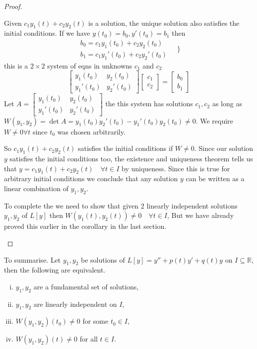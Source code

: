 \documentclass{article}
\theoremstyle{plain}
\theoremstyle{definition}
\numberwithin{equation}{section}
\begin{document}
\begin{proof}
\begin{enumerate}[(i)]
    Given $c_1y_1(t) + c_2y_2(t)$ is a solution, the unique solution also satisfies the initial conditions. If we have $y(t_0)=b_0, y'(t_0)=b_1$ then
    \[
    \begin{matrix}
        b_0 = c_1y_1(t_0) + c_2y_2(t_0) \\
        b_1 = c_1y_1'(t_0) + c_2y_2'(t_0)
    \end{matrix}\quad\Bigg\}
    \]
    this is a $2\times2$ system of eqns in unknowns $c_1$ and $c_2$
    \[
    \begin{bmatrix}
        y_1(t_0) & y_2(t_0) \\
        y_1'(t_0) & y_2'(t_0)
    \end{bmatrix}
    \begin{bmatrix}
        c_1 \\
        c_2
    \end{bmatrix}
    =
    \begin{bmatrix}
        b_0 \\
        b_1
    \end{bmatrix}
    \]
    Let $A = \begin{bmatrix}
        y_1(t_0) & y_2(t_0) \\
        y_1'(t_0) & y_2'(t_0)
    \end{bmatrix}$ the this system has solutions $c_1,c_2$ as long as $W(y_1,y_2) = \det A = y_1(t_0)y_2'(t_0) - y_1'(t_0)y_2(t_0) \neq 0$. We require $W\neq 0 \forall t$ since $t_0$ was chosen arbitrarily.

    So $c_1y_1(t) + c_2y_2(t)$ satisfies the initial conditions if $W\neq 0$. Since our solution $y$ satisfies the initial conditions too, the existence and uniqueness theorem tells us that $y=c_1y_1(t) + c_2y_2(t) \quad \forall t\in I$ by uniqueness. Since this is true for arbitrary initial conditions we conclude that any solution $y$ can be written as a linear combination of $y_1,y_2$.

    To complete the  we need to show that given 2 linearly independent solutions $y_1,y_2$ of $L[y]$ then $W(y_1(t),y_2(t))\neq 0 \quad \forall t \in I$, But we have already proved this earlier in the corollary in the last section.
\end{enumerate}
\end{proof}

To summarise. Let $y_1, y_2$ be solutions of $L[y] = y'' + p(t)y' + q(t)y$ on $I \subseteq \mathbb{R}$, then the following are equivalent.
\begin{enumerate}[(i)]
    \item $y_1,y_2$ are a fundamental set of solutions,
    \item $y_1,y_2$ are linearly independent on $I$,
    \item $W(y_1,y_2)(t_0)\neq 0 $ for some $t_0 \in I$,
    \item $W(y_1,y_2)(t)\neq 0 $ for all $t \in I$.
\end{enumerate}
\end{document}
